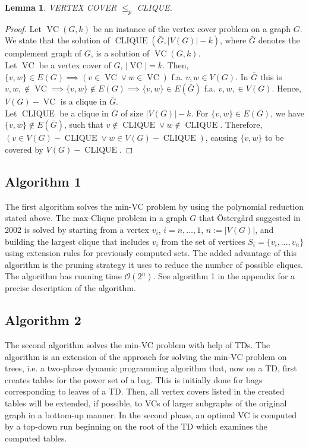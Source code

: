 \documentclass[11pt,a4paper]{article}
\newtheorem*{lemma}{Lemma}
\DeclareMathOperator{\VC}{VC}
\DeclareMathOperator{\CLIQUE}{CLIQUE}
\begin{document}
\begin{lemma}
VERTEX COVER $\leq_{p}$ CLIQUE.
\end{lemma}

\begin{proof}
Let $\VC(G, k)$ be an instance of the vertex cover problem on a graph $G$. We state that the solution of $\CLIQUE(\bar G, |V(G)|-k)$, where $\bar G$ denotes the complement graph of $G$, is a solution of $\VC(G, k)$. \\

Let $\VC$ be a vertex cover of $G$, $|\VC| = k$. Then, $\{v,w\} \in E(G) \implies (v \in \VC \lor w \in \VC)$ f.a. $v,w \in V(G)$. In $\bar G$ this is $v,w, \not \in \VC \implies \{v,w\} \not \in E(G) \implies \{v,w\} \in E(\bar G)$ f.a. $v,w, \in V(G)$. Hence, $V(G) - \VC$ is a clique in $\bar G$. \\

Let $\CLIQUE$ be a clique in $\bar G$ of size $|V(G)|-k$. For $\{v,w\} \in E(G)$, we have $\{v,w\} \not \in E(\bar G)$, such that $v \not \in \CLIQUE \lor w \not \in \CLIQUE$. Therefore, $(v \in V(G) - \CLIQUE \lor w \in V(G) - \CLIQUE)$, causing $\{v,w\}$ to be covered by $V(G) - \CLIQUE$.
\end{proof}

\subsection{Algorithm 1}
The first algorithm solves the min-VC problem by using the polynomial reduction stated above. The max-Clique problem in a graph $G$ that Östergård suggested in 2002 is solved by starting from a vertex $v_i$, $i=n, \dots, 1$, $n :=|V(G)|$, and building the largest clique that includes $v_i$ from the set of vertices $S_i = \{v_i, ..., v_n\}$ using extension rules for previously computed sets. The added advantage of this algorithm is the pruning strategy it uses to reduce the number of possible cliques. The algorithm has running time $\mathcal{O}(2^{n})$. See algorithm 1 in the appendix for a precise description of the algorithm.


\subsection{Algorithm 2}

The second algorithm solves the min-VC problem with help of TDs. The algorithm is an extension of the approach for solving the min-VC problem on trees, i.e. a two-phase dynamic programming algorithm that, now on a TD, first creates tables for the power set of a bag. This is initially done for bags corresponding to leaves of a TD. Then, all vertex covers listed in the created tables will be extended, if possible, to VCs of larger subgraphs of the original graph in a bottom-up manner. In the second phase, an optimal VC is computed by a top-down run beginning on the root of the TD which examines the computed tables.
\end{document}
